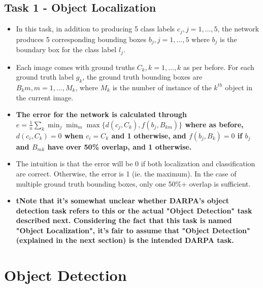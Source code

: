 \documentclass{article}
\begin{document}
\subsection{Task 1 - Object Localization}
\begin{itemize}
    \item In this task, in addition to producing 5 class labels $c_j, j=1,...,5$, the network produces 5 corresponding bounding boxes $b_j, j = 1,...,5$ where $b_j$ is the boundary box for the class label $l_j$.
    \item Each image comes with ground truths $C_k, k = 1,...,k$ as per before. For each ground truth label $g_k$, the ground truth bounding boxes are $B_km, m = 1,...,M_k$, where $M_k$ is the number of instance of the $k^{th}$ object in the current image.
    \item \textbf{The error for the network is calculated through $e = \frac{1}{n} \sum_k \min_j \min_m \max \{ d(c_j, C_k), f(b_j,B_{km}) \}$ where as before, $d(c_i, C_k) = 0$ when $c_i = C_k$ and 1 otherwise, and $f(b_j, B_k) = 0$ if $b_j$ and $B_{mk}$ have over 50\% overlap, and 1 otherwise.}
    \item The intuition is that the error will be 0 if both localization and classification are correct. Otherwise, the error is 1 (ie. the maximum). In the case of multiple ground truth bounding boxes, only one 50\%+ overlap is sufficient.
    \item \textbf{tNote that it's somewhat unclear whether DARPA's object detection task refers to this or the actual "Object Detection" task described next. Considering the fact that this task is named "Object Localization", it's fair to assume that "Object Detection" (explained in the next section) is the intended DARPA task.}
\end{itemize}

\section{Object Detection}
\end{document}
